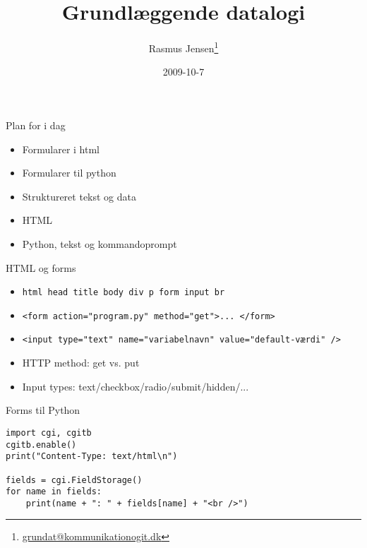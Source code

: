 \documentclass[a4paper,landscape]{slides}
\title{Grundlæggende datalogi}
\author{Rasmus Jensen\footnote{\url{grundat@kommunikationogit.dk}}}
\date{2009-10-7}
\begin{document}
\maketitle

\begin{slide}
	\begin{center} {\large 
            Plan for i dag
	} \end{center}
	\begin{itemize} \addtolength{\itemsep}{-\baselineskip}
		\item Formularer i html
		\item Formularer til python
		\item Struktureret tekst og data
		\item HTML
		\item Python, tekst og kommandoprompt
	\end{itemize}
\end{slide}

\begin{slide}
	\begin{center} {\large 
            HTML og forms
	} \end{center}
	\begin{itemize} \addtolength{\itemsep}{-\baselineskip}
		\item {\tt html head title body div p form input br }
                \item {\tt <form action="program.py" method="get">... </form> }
                \item {\tt <input type="text" name="variabelnavn" value="default-værdi" />}
                \item HTTP method: get vs. put
                \item Input types: text/checkbox/radio/submit/hidden/...
	\end{itemize}
\end{slide}

\begin{slide}
	\begin{center} {\large 
            Forms til Python
	} \end{center}
\begin{verbatim}
import cgi, cgitb
cgitb.enable()
print("Content-Type: text/html\n")

fields = cgi.FieldStorage()
for name in fields:
    print(name + ": " + fields[name] + "<br />")
\end{verbatim}
\end{slide}
\end{document}
